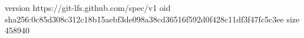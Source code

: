 version https://git-lfs.github.com/spec/v1
oid sha256:0c85d308c312c18b15aebf3de098a38cd36516f592d0f428c11df3f47fc5c3ee
size 458940
